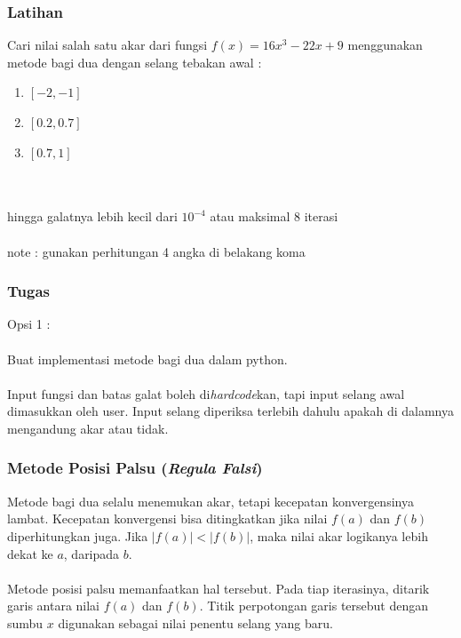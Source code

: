 \documentclass{beamer}
\begin{document}
\begin{frame}
\frametitle{Latihan}
Cari nilai salah satu akar dari fungsi $f(x) = 16x^3 -22x +9$ menggunakan metode bagi dua dengan selang tebakan awal :
\begin{enumerate}
\item $[-2,-1]$
\item $[0.2,0.7]$
\item $[0.7,1]$
\end{enumerate}
\ \\\ \\
hingga galatnya lebih kecil dari $10^{-4}$ atau maksimal 8 iterasi 
\\\ \\note : gunakan perhitungan 4 angka di belakang koma
\end{frame}


\begin{frame}
\frametitle{Tugas}
Opsi 1 :\\\ \\
Buat implementasi metode bagi dua dalam python. \\\ \\Input fungsi dan batas galat boleh di\textit{hardcode}kan, tapi input selang awal dimasukkan oleh user. Input selang diperiksa terlebih dahulu apakah di dalamnya mengandung akar atau tidak.
\end{frame}


\begin{frame}
\frametitle{Metode Posisi Palsu (\textit{Regula Falsi})}
Metode bagi dua selalu menemukan akar, tetapi kecepatan konvergensinya lambat. Kecepatan konvergensi bisa ditingkatkan jika nilai $f(a)$ dan $f(b)$ diperhitungkan juga. Jika $|f(a)|<|f(b)|$, maka nilai akar logikanya lebih dekat ke $a$, daripada $b$.\\\ \\Metode posisi palsu memanfaatkan hal tersebut. Pada tiap iterasinya, ditarik garis antara nilai $f(a)$ dan $f(b)$. Titik perpotongan garis tersebut dengan sumbu $x$ digunakan sebagai nilai penentu selang yang baru.
\end{frame}

\end{document}
